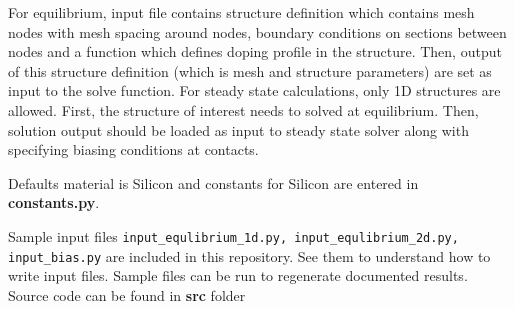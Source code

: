 For equilibrium, input file contains structure definition which contains mesh nodes with mesh spacing around nodes, boundary conditions on sections between nodes and a function which defines doping profile in the structure. Then, output of this structure definition (which is mesh and structure parameters) are set as input to the solve function. For steady state calculations, only 1D structures are allowed. First, the structure of interest needs to solved at equilibrium. Then, solution output should be loaded as input to steady state solver along with specifying biasing conditions at contacts.

Defaults material is Silicon and constants for Silicon are entered in \textbf{constants.py}.

Sample input files \verb!input_equlibrium_1d.py, input_equlibrium_2d.py, input_bias.py! are included in this repository. See them to understand how to write input files. Sample files can be run to regenerate documented results. Source code can be found in \textbf{src} folder
